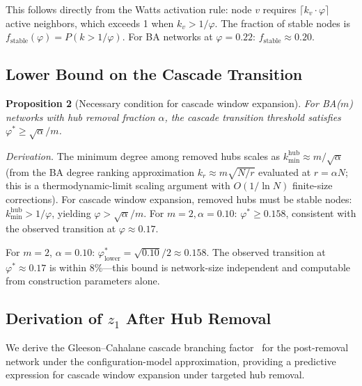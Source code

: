 \documentclass[aps,pre,twocolumn,superscriptaddress,showpacs]{revtex4-2}
\begin{document}
This follows directly from the Watts activation rule: node $v$ requires $\lceil k_v \cdot \varphi \rceil$ active neighbors, which exceeds 1 when $k_v > 1/\varphi$. The fraction of stable nodes is $f_{\mathrm{stable}}(\varphi) = P(k > 1/\varphi)$. For BA networks at $\varphi=0.22$: $f_{\mathrm{stable}} \approx 0.20$.

\subsection{Lower Bound on the Cascade Transition}

\textbf{Proposition 2} (Necessary condition for cascade window expansion). \emph{For BA($m$) networks with hub removal fraction $\alpha$, the cascade transition threshold satisfies $\varphi^* \geq \sqrt{\alpha}/m$.}

\emph{Derivation.} The minimum degree among removed hubs scales as $k_{\min}^{\mathrm{hub}} \approx m/\sqrt{\alpha}$ (from the BA degree ranking approximation $k_r \approx m\sqrt{N/r}$ evaluated at $r = \alpha N$; this is a thermodynamic-limit scaling argument with $O(1/\ln N)$ finite-size corrections). For cascade window expansion, removed hubs must be stable nodes: $k_{\min}^{\mathrm{hub}} > 1/\varphi$, yielding $\varphi > \sqrt{\alpha}/m$. For $m=2, \alpha=0.10$: $\varphi^* \geq 0.158$, consistent with the observed transition at $\varphi \approx 0.17$.

For $m=2$, $\alpha=0.10$: $\varphi^*_{\mathrm{lower}} = \sqrt{0.10}/2 \approx 0.158$. The observed transition at $\varphi^* \approx 0.17$ is within 8\%---this bound is network-size independent and computable from construction parameters alone.

\subsection{Derivation of $z_1$ After Hub Removal}
\label{sec:z1}

We derive the Gleeson--Cahalane cascade branching factor~\cite{Gleeson2007} for the post-removal network under the configuration-model approximation, providing a predictive expression for cascade window expansion under targeted hub removal.
\end{document}
